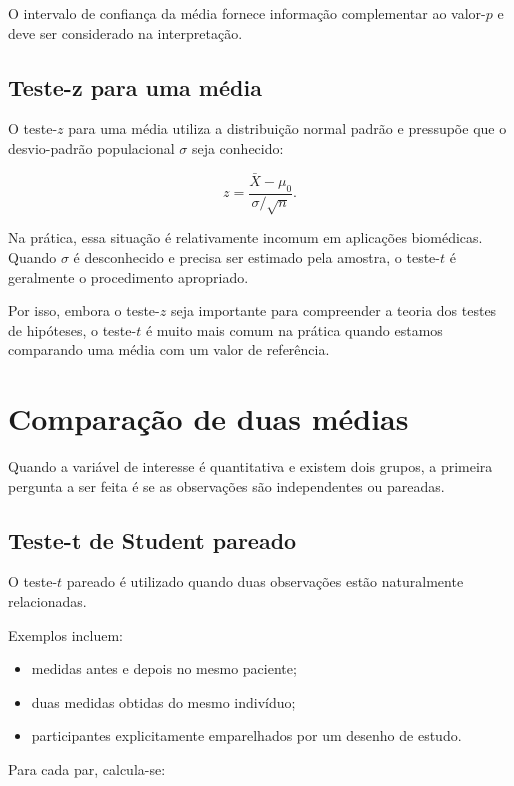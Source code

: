 O intervalo de confiança da média fornece informação complementar ao
valor-$p$ e deve ser considerado na interpretação.

\subsection{Teste-z para uma média}

O teste-$z$ para uma média utiliza a distribuição normal padrão e pressupõe
que o desvio-padrão populacional $\sigma$ seja conhecido:

\begin{equation}
  z= \frac{\bar X-\mu_0}{\sigma/\sqrt{n}}.
\end{equation}

Na prática, essa situação é relativamente incomum em aplicações biomédicas.
Quando $\sigma$ é desconhecido e precisa ser estimado pela amostra, o
teste-$t$ é geralmente o procedimento apropriado.

Por isso, embora o teste-$z$ seja importante para compreender a teoria dos
testes de hipóteses, o teste-$t$ é muito mais comum na prática quando estamos
comparando uma média com um valor de referência.

\section{Comparação de duas médias}

Quando a variável de interesse é quantitativa e existem dois grupos, a
primeira pergunta a ser feita é se as observações são independentes ou
pareadas.

\subsection{Teste-t de Student pareado}

O teste-$t$ pareado é utilizado quando duas observações estão naturalmente
relacionadas.

Exemplos incluem:

\begin{itemize}
    \item medidas antes e depois no mesmo paciente;
    \item duas medidas obtidas do mesmo indivíduo;
    \item participantes explicitamente emparelhados por um desenho de estudo.
\end{itemize}

Para cada par, calcula-se:

